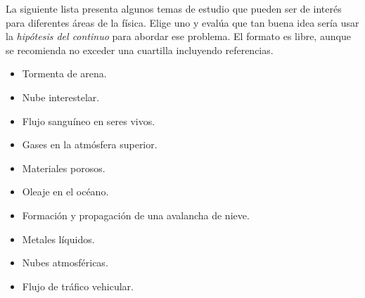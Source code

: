 \documentclass[../main.tex]{subfiles}
\begin{document}
\begin{problema}
	La siguiente lista presenta algunos temas de estudio que pueden ser de
	interés para diferentes áreas de la física. Elige uno y evalúa que tan
	buena idea sería usar la \emph{hipótesis del continuo} para abordar ese
	problema. El formato es libre, aunque se recomienda no exceder una
	cuartilla incluyendo referencias.

	\begin{itemize}
		\item Tormenta de arena.
		\item Nube interestelar.
		\item Flujo sanguíneo en seres vivos.
		\item Gases en la atmósfera superior.
		\item Materiales porosos.
		\item Oleaje en el océano.
		\item Formación y propagación de una avalancha de nieve.
		\item Metales líquidos.
		\item  Nubes atmosféricas.
		\item Flujo de tráfico vehicular.
	\end{itemize}
\end{problema}
\end{document}
